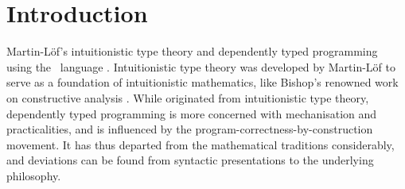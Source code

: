 \chapter{Introduction}
\label{chap:introduction}


Martin-Löf's intuitionistic type theory \citep{ML-TT73, ML-TT84, Nordstrom-programming} and dependently typed programming~\citep{Altenkirch-why-dependent-types-matter, McBride-Epigram} using the \Agda\ language \citep{Norell-thesis, Norell-Agda, Bove-dependent-types-at-work}.
Intuitionistic type theory was developed by Martin-Löf to serve as a foundation of intuitionistic mathematics, like Bishop's renowned work on constructive analysis \citep{Bishop-analysis}.
While originated from intuitionistic type theory, dependently typed programming is more concerned with mechanisation and practicalities, and is influenced by the program-correctness-by-construction movement.
It has thus departed from the mathematical traditions considerably, and deviations can be found from syntactic presentations to the underlying philosophy.
